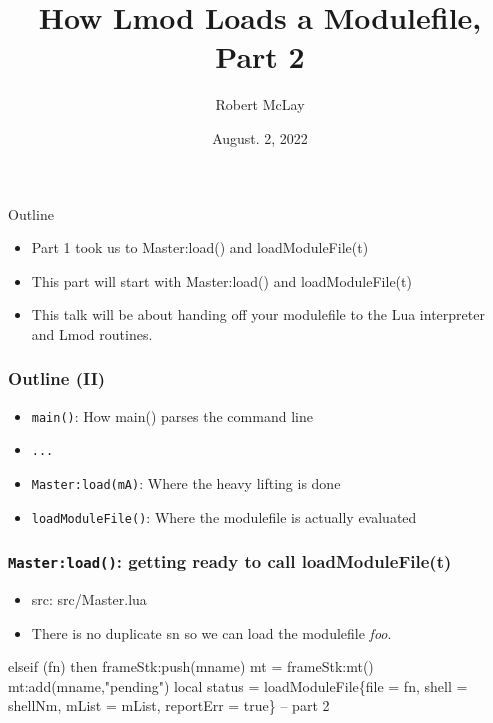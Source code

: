 \documentclass{beamer}
\begin{document}
\title[Lmod]{How Lmod Loads a Modulefile, Part 2}
\author{Robert McLay} 
\date{August. 2, 2022}

\frame{\titlepage} 


\begin{frame}{Outline}
  \begin{itemize}
    \item Part 1 took us to Master:load() and loadModuleFile(t)
    \item This part will start with Master:load() and loadModuleFile(t)
    \item This talk will be about handing off your modulefile to the
      Lua interpreter and Lmod routines.
  \end{itemize}
\end{frame}

\begin{frame}[fragile]
    \frametitle{Outline (II)}
  \begin{itemize}
    \item \texttt{main()}: How main() parses the command line
    \item \texttt{...}
    \item \texttt{Master:load(mA)}: Where the heavy lifting is done
    \item \texttt{loadModuleFile()}: Where the modulefile is actually evaluated
  \end{itemize}
\end{frame}

\begin{frame}[fragile]
    \frametitle{\texttt{Master:load()}: getting ready to call loadModuleFile(t)}
  \begin{itemize}
    \item src: src/Master.lua
    \item There is no duplicate sn so we can load the modulefile {\color{blue}\emph{foo}}.
  \end{itemize}
 {\tiny
    \begin{semiverbatim}
elseif (fn) then
   frameStk:push(mname)
   mt = frameStk:mt()
   mt:add(mname,"pending")
   local status = loadModuleFile\{file = fn, shell = shellNm,
                   mList = mList, reportErr = true\}
   -- part 2

    \end{semiverbatim}
}
\end{frame}
\end{document}
